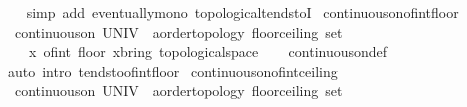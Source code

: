 \begin{isabellebody}
\ \ \isamarkupfalse%
\ {\isacharparenleft}{\kern0pt}simp\ add{\isacharcolon}{\kern0pt}\ eventually{\isacharunderscore}{\kern0pt}mono\ topological{\isacharunderscore}{\kern0pt}tendstoI{\isacharparenright}{\kern0pt}%
\endisatagproof
{\isafoldproof}%
%
\isadelimproof
\isanewline
%
\endisadelimproof
\isanewline
{}\isamarkupfalse%
\ continuous{\isacharunderscore}{\kern0pt}on{\isacharunderscore}{\kern0pt}of{\isacharunderscore}{\kern0pt}int{\isacharunderscore}{\kern0pt}floor{\isacharcolon}{\kern0pt}\isanewline
\ \ {\isachardoublequoteopen}continuous{\isacharunderscore}{\kern0pt}on\ {\isacharparenleft}{\kern0pt}UNIV\ {\isacharminus}{\kern0pt}\ {\isasymint}{\isacharcolon}{\kern0pt}{\isacharcolon}{\kern0pt}{\isacharprime}{\kern0pt}a{\isacharcolon}{\kern0pt}{\isacharcolon}{\kern0pt}{\isacharbraceleft}{\kern0pt}order{\isacharunderscore}{\kern0pt}topology{\isacharcomma}{\kern0pt}\ floor{\isacharunderscore}{\kern0pt}ceiling{\isacharbraceright}{\kern0pt}\ set{\isacharparenright}{\kern0pt}\isanewline
\ \ \ \ {\isacharparenleft}{\kern0pt}{\isasymlambda}x{\isachardot}{\kern0pt}\ of{\isacharunderscore}{\kern0pt}int\ {\isacharparenleft}{\kern0pt}floor\ x{\isacharparenright}{\kern0pt}{\isacharcolon}{\kern0pt}{\isacharcolon}{\kern0pt}{\isacharprime}{\kern0pt}b{\isacharcolon}{\kern0pt}{\isacharcolon}{\kern0pt}{\isacharbraceleft}{\kern0pt}ring{\isacharunderscore}{\kern0pt}{}{\isacharcomma}{\kern0pt}\ topological{\isacharunderscore}{\kern0pt}space{\isacharbraceright}{\kern0pt}{\isacharparenright}{\kern0pt}{\isachardoublequoteclose}\isanewline
%
\isadelimproof
\ \ %
\endisadelimproof
%
\isatagproof
{}\isamarkupfalse%
\ continuous{\isacharunderscore}{\kern0pt}on{\isacharunderscore}{\kern0pt}def\isanewline
\ \ \isamarkupfalse%
\ {\isacharparenleft}{\kern0pt}auto\ intro{\isacharbang}{\kern0pt}{\isacharcolon}{\kern0pt}\ tendsto{\isacharunderscore}{\kern0pt}of{\isacharunderscore}{\kern0pt}int{\isacharunderscore}{\kern0pt}floor{\isacharparenright}{\kern0pt}%
\endisatagproof
{\isafoldproof}%
%
\isadelimproof
\isanewline
%
\endisadelimproof
\isanewline
{}\isamarkupfalse%
\ continuous{\isacharunderscore}{\kern0pt}on{\isacharunderscore}{\kern0pt}of{\isacharunderscore}{\kern0pt}int{\isacharunderscore}{\kern0pt}ceiling{\isacharcolon}{\kern0pt}\isanewline
\ \ {\isachardoublequoteopen}continuous{\isacharunderscore}{\kern0pt}on\ {\isacharparenleft}{\kern0pt}UNIV\ {\isacharminus}{\kern0pt}\ {\isasymint}{\isacharcolon}{\kern0pt}{\isacharcolon}{\kern0pt}{\isacharprime}{\kern0pt}a{\isacharcolon}{\kern0pt}{\isacharcolon}{\kern0pt}{\isacharbraceleft}{\kern0pt}order{\isacharunderscore}{\kern0pt}topology{\isacharcomma}{\kern0pt}\ floor{\isacharunderscore}{\kern0pt}ceiling{\isacharbraceright}{\kern0pt}\ set{\isacharparenright}{\kern0pt}\isanewline

\end{isabellebody}
